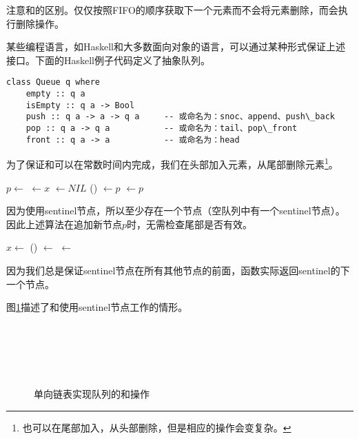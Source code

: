 \documentclass[UTF8]{article}
\begin{document}
注意和的区别。仅仅按照FIFO的顺序获取下一个元素而不会将元素删除，而会执行删除操作。

某些编程语言，如Haskell和大多数面向对象的语言，可以通过某种形式保证上述接口。下面的Haskell例子代码定义了抽象队列。

\lstset{language=Haskell}
\begin{lstlisting}[style=Haskell]
class Queue q where
    empty :: q a
    isEmpty :: q a -> Bool
    push :: q a -> a -> q a     -- 或命名为：snoc、append、push\_back
    pop :: q a -> q a           -- 或命名为：tail、pop\_front
    front :: q a -> a           -- 或命名为：head
\end{lstlisting}

为了保证和可以在常数时间内完成，我们在头部加入元素，从尾部删除元素\footnote{也可以在尾部加入，从头部删除，但是相应的操作会变复杂。}。

\begin{algorithmic}
  \State $p \gets $ 
  \State {} $\gets x$
  \State {} $\gets NIL$
  \State {}() $\gets p$
  \State {} $\gets p$
\EndFunction
\end{algorithmic}

因为使用sentinel节点，所以至少存在一个节点（空队列中有一个sentinel节点）。因此上述算法在追加新节点$p$时，无需检查尾部是否有效。

\begin{algorithmic}
  \State $x \gets $ 
  \State {}() $\gets$ 
   
    \State {} $\gets$ 
  \EndIf
  \State \Return {}
\EndFunction
\end{algorithmic}

因为我们总是保证sentinel节点在所有其他节点的前面，函数实际返回sentinel的下一个节点。

图\ref{fig:list-queue}描述了和使用sentinel节点工作的情形。

\begin{figure}[htbp]
 \centering
  \\
  \\
  \\
  \\
 \caption{单向链表实现队列的和操作} \label{fig:list-queue}
\end{figure}
\end{document}
